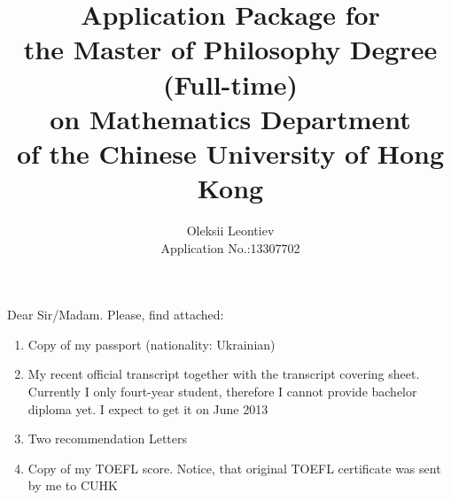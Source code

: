 \documentclass[8pt]{article} %
\title{Application Package for\\the Master of Philosophy Degree (Full-time)\\ on Mathematics Department \\of the Chinese University of Hong Kong}
\author{Oleksii Leontiev\\Application No.:13307702}
\begin{document}
\begin{CJK}{UTF8}{bsmi}
\maketitle
\end{CJK}

Dear Sir/Madam. Please, find attached:
\begin{enumerate}
	\item{Copy of my passport (nationality: Ukrainian)}
	\item{My recent official transcript together with the transcript covering sheet. Currently I only fourt-year student, therefore I cannot provide bachelor diploma yet. I expect to get it on June 2013}
	\item{Two recommendation Letters}
	\item{Copy of my TOEFL score. Notice, that original TOEFL certificate was sent by me to CUHK}
\end{enumerate}
\end{document}
